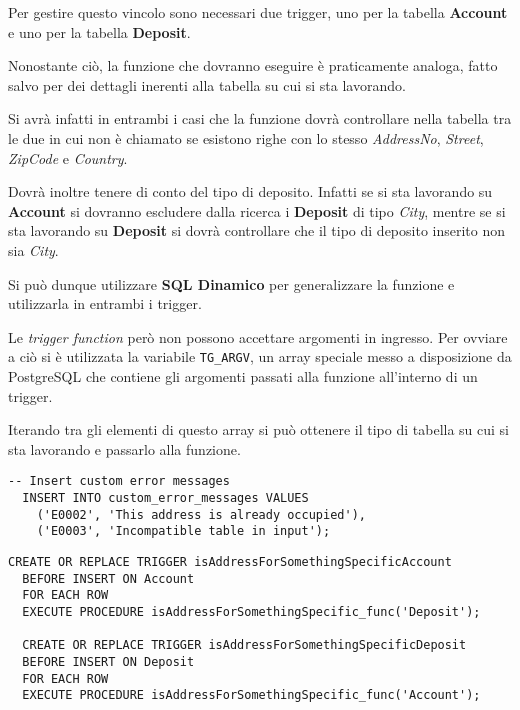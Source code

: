 Per gestire questo vincolo sono necessari due trigger, uno per la tabella \textbf{Account} e uno per la tabella \textbf{Deposit}.

Nonostante ciò, la funzione che dovranno eseguire è praticamente analoga, fatto salvo per dei dettagli inerenti alla tabella su cui si sta lavorando.

Si avrà infatti in entrambi i casi che la funzione dovrà controllare nella tabella tra le due in cui non è chiamato se esistono righe con lo stesso \textit{AddressNo}, \textit{Street}, \textit{ZipCode} e \textit{Country}.

Dovrà inoltre tenere di conto del tipo di deposito. Infatti se si sta lavorando su \textbf{Account} si dovranno escludere dalla ricerca i \textbf{Deposit} di tipo \textit{City}, mentre se si sta lavorando su \textbf{Deposit} si dovrà controllare che il tipo di deposito inserito non sia \textit{City}.

Si può dunque utilizzare \textbf{SQL Dinamico} per generalizzare la funzione e utilizzarla in entrambi i trigger.

Le \textit{trigger function} però non possono accettare argomenti in ingresso. Per ovviare a ciò si è utilizzata la variabile \lstinline{TG_ARGV}, un array speciale messo a disposizione da PostgreSQL che contiene gli argomenti passati alla funzione all'interno di un trigger.

Iterando tra gli elementi di questo array si può ottenere il tipo di tabella su cui si sta lavorando e passarlo alla funzione.

\begin{lstlisting}[caption={Creazione errori personalizzati per \textbf{isAddressForSomethingSpecific}}]
  -- Insert custom error messages
  INSERT INTO custom_error_messages VALUES 
    ('E0002', 'This address is already occupied'),
    ('E0003', 'Incompatible table in input');
\end{lstlisting}

\begin{lstlisting}[caption={Creazione dei trigger per il vincolo \textbf{isAddressForSomethingSpecific}}]
  CREATE OR REPLACE TRIGGER isAddressForSomethingSpecificAccount
  BEFORE INSERT ON Account
  FOR EACH ROW
  EXECUTE PROCEDURE isAddressForSomethingSpecific_func('Deposit');

  CREATE OR REPLACE TRIGGER isAddressForSomethingSpecificDeposit
  BEFORE INSERT ON Deposit
  FOR EACH ROW
  EXECUTE PROCEDURE isAddressForSomethingSpecific_func('Account');
\end{lstlisting}

